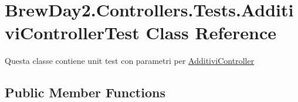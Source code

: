 \hypertarget{class_brew_day2_1_1_controllers_1_1_tests_1_1_additivi_controller_test}{}\section{Brew\+Day2.\+Controllers.\+Tests.\+Additivi\+Controller\+Test Class Reference}
\label{class_brew_day2_1_1_controllers_1_1_tests_1_1_additivi_controller_test}


Questa classe contiene unit test con parametri per \mbox{\hyperlink{class_brew_day2_1_1_controllers_1_1_additivi_controller}{Additivi\+Controller}} 


\subsection*{Public Member Functions}
